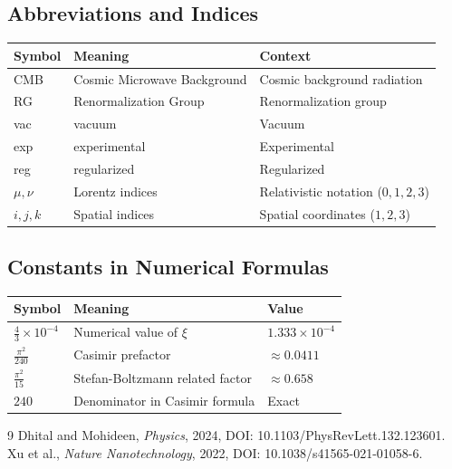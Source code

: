 	\subsection{Abbreviations and Indices}
	\begin{longtable}{>{\raggedright\arraybackslash}p{1.5cm} >{\raggedright\arraybackslash}p{6.5cm} >{\raggedright\arraybackslash}p{2.5cm}}
		\toprule
		\textbf{Symbol} & \textbf{Meaning} & \textbf{Context} \\
		\midrule
		CMB & Cosmic Microwave Background & Cosmic background radiation \\
		RG & Renormalization Group & Renormalization group \\
		vac & vacuum & Vacuum \\
		exp & experimental & Experimental \\
		reg & regularized & Regularized \\
		$\mu, \nu$ & Lorentz indices & Relativistic notation ($0,1,2,3$) \\
		$i, j, k$ & Spatial indices & Spatial coordinates ($1,2,3$) \\
		\bottomrule
	\end{longtable}
	
	\subsection{Constants in Numerical Formulas}
	\begin{longtable}{>{\raggedright\arraybackslash}p{1.5cm} >{\raggedright\arraybackslash}p{6.5cm} >{\raggedright\arraybackslash}p{2.5cm}}
		\toprule
		\textbf{Symbol} & \textbf{Meaning} & \textbf{Value} \\
		\midrule
		$\frac{4}{3} \times 10^{-4}$ & Numerical value of $\xi$ & $1.333 \times 10^{-4}$ \\
		$\frac{\pi^2}{240}$ & Casimir prefactor & $\approx 0.0411$ \\
		$\frac{\pi^2}{15}$ & Stefan-Boltzmann related factor & $\approx 0.658$ \\
		$240$ & Denominator in Casimir formula & Exact \\
		\bottomrule
	\end{longtable}
		\begin{thebibliography}{9}
		Dhital and Mohideen, \emph{Physics}, 2024, DOI: 10.1103/PhysRevLett.132.123601.
		Xu et al., \emph{Nature Nanotechnology}, 2022, DOI: 10.1038/s41565-021-01058-6.
	\end{thebibliography}
